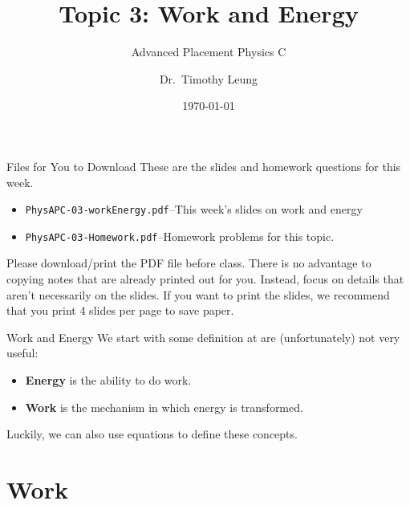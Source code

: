 \documentclass[12pt,compress,aspectratio=169]{beamer}
\title{Topic 3: Work and Energy}
\subtitle{Advanced Placement Physics C}
\author[TML]{Dr.\ Timothy Leung}
\institute{Olympiads School}
\date{\today}
\begin{document}
\begin{frame}
  \maketitle
\end{frame}

\begin{frame}{Files for You to Download}
  These are the slides and homework questions for this week.
  \begin{itemize}
  \item\texttt{PhysAPC-03-workEnergy.pdf}--This week's slides on work and
    energy
  \item\texttt{PhysAPC-03-Homework.pdf}--Homework problems for this topic.
  \end{itemize}
  Please download/print the PDF file before class. There is no advantage to
  copying notes that are already printed out for you. Instead, focus on details
  that aren't necessarily on the slides. If you want to print the slides, we
  recommend that you print 4 slides per page to save paper.
\end{frame}



\begin{frame}{Work and Energy}
  We start with some definition at are (unfortunately) not very useful:
  \begin{itemize}
    \item \textbf{Energy} is the ability to do work.
    \item \textbf{Work} is the mechanism in which energy is transformed.
  \end{itemize}
  Luckily, we can also use equations to define these concepts.
\end{frame}


\section{Work}
\end{document}
